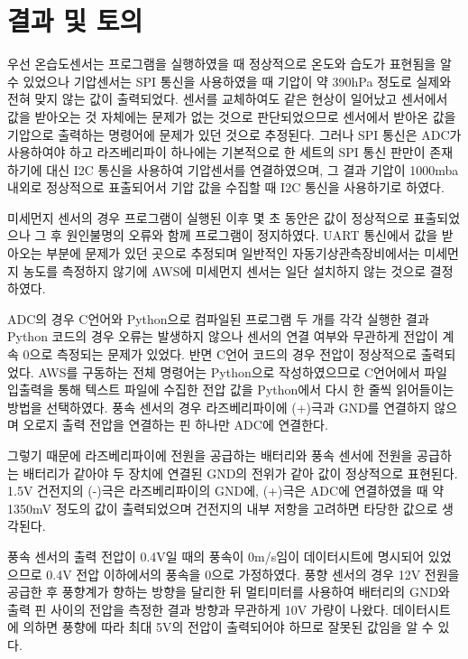 \section{결과 및 토의}

우선 온습도센서는 프로그램을 실행하였을 때 정상적으로 온도와 습도가 표현됨을 알 수 있었으나 기압센서는 SPI 통신을 사용하였을 때 기압이 약 390hPa 정도로 실제와 전혀 맞지 않는 값이 출력되었다. 센서를 교체하여도 같은 현상이 일어났고 센서에서 값을 받아오는 것 자체에는 문제가 없는 것으로 판단되었으므로 센서에서 받아온 값을 기압으로 출력하는 명령어에 문제가 있던 것으로 추정된다. 그러나 SPI 통신은 ADC가 사용하여야 하고 라즈베리파이 하나에는 기본적으로 한 세트의 SPI 통신 판만이 존재하기에 대신 I2C 통신을 사용하여 기압센서를 연결하였으며, 그 결과 기압이 1000mba 내외로 정상적으로 표출되어서 기압 값을 수집할 때 I2C 통신을 사용하기로 하였다. 

미세먼지 센서의 경우 프로그램이 실행된 이후 몇 초 동안은 값이 정상적으로 표출되었으나 그 후 원인불명의 오류와 함께 프로그램이 정지하였다. UART 통신에서 값을 받아오는 부분에 문제가 있던 곳으로 추정되며 일반적인 자동기상관측장비에서는 미세먼지 농도를 측정하지 않기에 AWS에 미세먼지 센서는 일단 설치하지 않는 것으로 결정하였다. 

ADC의 경우 C언어와 Python으로 컴파일된 프로그램 두 개를 각각 실행한 결과 Python 코드의 경우 오류는 발생하지 않으나 센서의 연결 여부와 무관하게 전압이 계속 0으로 측정되는 문제가 있었다. 반면 C언어 코드의 경우 전압이 정상적으로 출력되었다. AWS를 구동하는 전체 명령어는 Python으로 작성하였으므로 C언어에서 파일 입출력을 통해 텍스트 파일에 수집한 전압 값을 Python에서 다시 한 줄씩 읽어들이는 방법을 선택하였다. 풍속 센서의 경우 라즈베리파이에 (+)극과 GND를 연결하지 않으며 오로지 출력 전압을 연결하는 핀 하나만 ADC에 연결한다. 

그렇기 때문에 라즈베리파이에 전원을 공급하는 배터리와 풍속 센서에 전원을 공급하는 배터리가 같아야 두 장치에 연결된 GND의 전위가 같아 값이 정상적으로 표현된다. 1.5V 건전지의 (-)극은 라즈베리파이의 GND에, (+)극은 ADC에 연결하였을 때 약 1350mV 정도의 값이 출력되었으며 건전지의 내부 저항을 고려하면 타당한 값으로 생각된다. 

풍속 센서의 출력 전압이 0.4V일 때의 풍속이 0m/s임이 데이터시트에 명시되어 있었으므로 0.4V 전압 이하에서의 풍속을 0으로 가정하였다. 풍향 센서의 경우 12V 전원을 공급한 후 풍향계가 향하는 방향을 달리한 뒤 멀티미터를 사용하여 배터리의 GND와 출력 핀 사이의 전압을 측정한 결과 방향과 무관하게 10V 가량이 나왔다. 데이터시트에 의하면 풍향에 따라 최대 5V의 전압이 출력되어야 하므로 잘못된 값임을 알 수 있다. 

